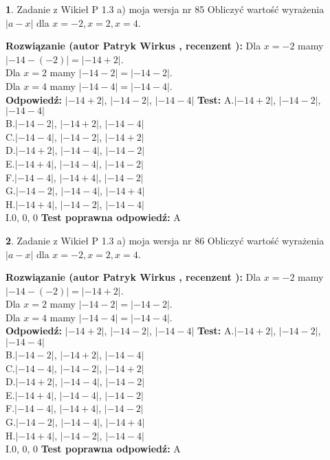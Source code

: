 \documentclass[12pt, a4paper]{article}
\theoremstyle{definition} %
\newtheorem{zad}{}
\newcommand{\zadStart}[1]{\begin{zad}#1\newline}
\newcommand{\zadStop}{\end{zad}}
\newcommand{\rozwStart}[2]{\noindent \textbf{Rozwiązanie (autor #1 , recenzent #2): }\newline}
\newcommand{\rozwStop}{\newline}
\newcommand{\odpStart}{\noindent \textbf{Odpowiedź:}\newline}
\newcommand{\odpStop}{\newline}
\newcommand{\testStart}{\noindent \textbf{Test:}\newline}
\newcommand{\testStop}{\newline}
\newcommand{\kluczStart}{\noindent \textbf{Test poprawna odpowiedź:}\newline}
\newcommand{\kluczStop}{\newline}
\begin{document}
\zadStart{Zadanie z Wikieł P 1.3 a) moja wersja nr 85}
Obliczyć wartość wyrażenia $|a - x|$ dla $x=-2,x=2,x=4$.
\zadStop
\rozwStart{Patryk Wirkus}{}
Dla $x = -2$ mamy $|-14 - (-2)| = |-14 + 2|$.\\
Dla $x = 2$ mamy $|-14 - 2| = |-14 - 2|$.\\
Dla $x = 4$ mamy $|-14 - 4| = |-14 - 4|$.\\
\rozwStop
\odpStart
$|-14 + 2|$, $|-14 - 2|$, $|-14 - 4|$
\odpStop
\testStart
A.$|-14 + 2|$, $|-14 - 2|$, $|-14 - 4|$\\
B.$|-14 - 2|$, $|-14 + 2|$, $|-14 - 4|$\\
C.$|-14 - 4|$, $|-14 - 2|$, $|-14 + 2|$\\
D.$|-14 + 2|$, $|-14 - 4|$, $|-14 - 2|$\\
E.$|-14 + 4|$, $|-14 - 4|$, $|-14 - 2|$\\
F.$|-14 - 4|$, $|-14 + 4|$, $|-14 - 2|$\\
G.$|-14 - 2|$, $|-14 - 4|$, $|-14 + 4|$\\
H.$|-14 + 4|$, $|-14 - 2|$, $|-14 - 4|$\\
I.$0$, $0$, $0$
\testStop
\kluczStart
A
\kluczStop



\zadStart{Zadanie z Wikieł P 1.3 a) moja wersja nr 86}
Obliczyć wartość wyrażenia $|a - x|$ dla $x=-2,x=2,x=4$.
\zadStop
\rozwStart{Patryk Wirkus}{}
Dla $x = -2$ mamy $|-14 - (-2)| = |-14 + 2|$.\\
Dla $x = 2$ mamy $|-14 - 2| = |-14 - 2|$.\\
Dla $x = 4$ mamy $|-14 - 4| = |-14 - 4|$.\\
\rozwStop
\odpStart
$|-14 + 2|$, $|-14 - 2|$, $|-14 - 4|$
\odpStop
\testStart
A.$|-14 + 2|$, $|-14 - 2|$, $|-14 - 4|$\\
B.$|-14 - 2|$, $|-14 + 2|$, $|-14 - 4|$\\
C.$|-14 - 4|$, $|-14 - 2|$, $|-14 + 2|$\\
D.$|-14 + 2|$, $|-14 - 4|$, $|-14 - 2|$\\
E.$|-14 + 4|$, $|-14 - 4|$, $|-14 - 2|$\\
F.$|-14 - 4|$, $|-14 + 4|$, $|-14 - 2|$\\
G.$|-14 - 2|$, $|-14 - 4|$, $|-14 + 4|$\\
H.$|-14 + 4|$, $|-14 - 2|$, $|-14 - 4|$\\
I.$0$, $0$, $0$
\testStop
\kluczStart
A
\kluczStop
\end{document}

